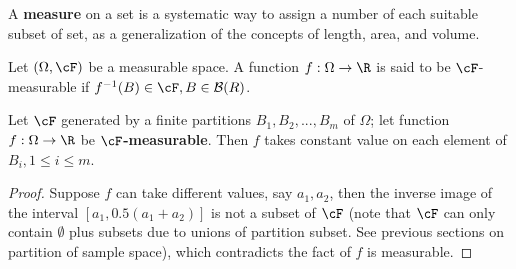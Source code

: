\begin{refsection}
\begin{remark}
A \textbf{measure} on a set is a systematic way to assign a number of each suitable subset of set, as a generalization of the concepts of length, area, and volume. 	
\end{remark}


\begin{definition}
Let $(\Omega,\cF)$ be a measurable space. A function $f:\Omega \to \R$ is said to be $\cF$-measurable if $f^{-1}(B)\in \cF,B\in \mathcal{B}(R)$.
\end{definition}

\begin{theorem}
Let $\cF$ generated by a finite partitions $B_1,B_2,...,B_m$ of $\Omega$; let function $f:\Omega\to \R$ be $\cF$\textbf{-measurable}. Then $f$ takes constant value on each element of $B_i,1\leq i \leq m$. 
\end{theorem}
\begin{proof}
Suppose $f$ can take different values, say $a_1,a_2$, then the inverse image of the interval $[a_1,0.5(a_1+a_2)]$ is not a subset of $\cF$ (note that $\cF$ can only contain $\emptyset$ plus subsets due to unions of partition subset. See previous sections on partition of sample space), which contradicts the fact of $f$ is measurable. 
\end{proof}


\end{refsection}
